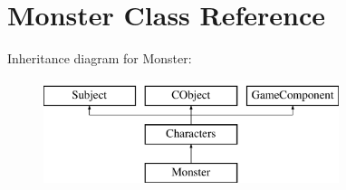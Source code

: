 \hypertarget{class_monster}{}\section{Monster Class Reference}
\label{class_monster}
Inheritance diagram for Monster\+:\begin{figure}[H]
\begin{center}
\leavevmode
\includegraphics[height=3.000000cm]{class_monster}
\end{center}
\end{figure}
